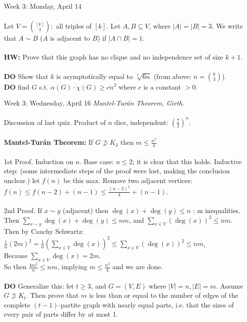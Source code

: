 \documentclass[12pt]{article}
\theoremstyle{remark}
\begin{document}
\begin{section}{Week 3: Monday, April 14}
\\\\
Let $V = {[k] \choose 3}:$ all triples of $[k]$. Let $A,B \subseteq V$, where $|A| = |B| = 3$. We write that $A \sim B$ ($A$ is adjacent to $B$) if $|A \cap B| = 1$.
\\\\
\textbf{HW:} Prove that this graph has no clique and no independence set of size $k+1$.
\\\\
\textbf{DO} Show that $k$ is asymptotically equal to $\sqrt[3]{6n}$ (from above: $n = {k \choose 3}$).
\\
\textbf{DO} find $G$ s.t. $\alpha(G) \cdot \chi(G) \geq cn^2$ where $c$ is a constant $ > 0$.
\end{section}
\newpage
\label{8}\begin{section}{Week 3: Wednesday, April 16}
\indent\textit{Mantel-Tur\'an Theorem, Girth.}\\\\
Discussion of last quiz. Product of $n$ dice, independent: $(\frac 7 2)^n$.
\\\\
\textbf{Mantel-Tur\'an Theorem:} If $G \not \supset K_3$ then $m \leq \frac{n^2}{4}$
\\\\
1st Proof. Induction on $n$. Base case: $n \leq 2$; it is clear that this holds. Inductive step: (some intermediate steps of the proof were lost, making the conclusion unclear.) let $f(n)$ be this max. Remove two adjacent vertices: $f(n) \leq f(n-2)+(n-1)\leq \frac{(n-2)^2}{4} + (n-1)$.
\\\\
2nd Proof. If $x \sim y$ (adjacent) then $\deg(x) + \deg(y) \leq n$ : m inequalities.\\
Then $\sum_{x \sim y} \deg(x) + \deg(y) \leq nm$, and $\sum_{x \in V} ( \deg(x))^2 \leq nm$.\\ Then by Cauchy Schwartz: $\frac 1n (2m)^2 = \frac 1n (\sum_{x \in V} \deg(x))^2 \leq \sum_{x \in V} ( \deg(x))^2 \leq nm$,\\ Because $\sum_{x \in V} \deg(x) = 2m$. 
\\So then $\frac{4m^2}{n} \leq nm$, implying $m \leq \frac{n^2}{4}$ and we are done.
\\\\
\textbf{DO} Generalize this: let $t \geq 3$, and $G = (V,E)$ where $|V| =n,|E| =m$. Assume $G \not \supset K_t$. Then prove that $m$ is less than or equal to the number of edges of the complete $(t-1)$-partite graph with nearly equal parts, i.e. that the sizes of every pair of parts differ by at most 1.

\end{section}
\end{document}
